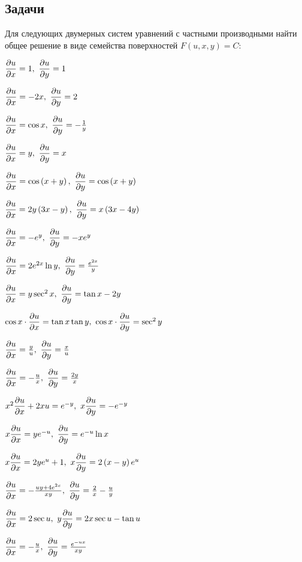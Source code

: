 \subsection{Задачи}

	Для следующих двумерных систем уравнений с частными производными найти общее решение в виде семейства поверхностей $F(u, x, y) = C$:

	\begin{multicols}{2}
		\begin{enumtasks}

			\label{nonlinsys_partialsyst:systems2}
			\item \( \dfrac{\partial u}{\partial x} = 1, ~ \dfrac{\partial u}{\partial y} = 1 \) %
			\item \( \dfrac{\partial u}{\partial x} = -2x, ~ \dfrac{\partial u}{\partial y} = 2 \) %
			\item \( \dfrac{\partial u}{\partial x} = \cos{x}, ~ \dfrac{\partial u}{\partial y} = -\frac{1}{y} \) %
			\item \( \dfrac{\partial u}{\partial x} = y, ~ \dfrac{\partial u}{\partial y} = x \) %
			\item \( \dfrac{\partial u}{\partial x} = \cos\left( x + y \right), ~ \dfrac{\partial u}{\partial y} = \cos\left( x + y \right) \) %
			\item \( \dfrac{\partial u}{\partial x} = 2y \left( 3x - y \right), ~ \dfrac{\partial u}{\partial y} = x \left( 3x - 4y \right) \) %
			\item \( \dfrac{\partial u}{\partial x} = - e^{y}, ~ \dfrac{\partial u}{\partial y} = - x e^{y} \) %
			\item \( \dfrac{\partial u}{\partial x} = 2 e^{2 x} \ln{y}, ~ \dfrac{\partial u}{\partial y} = \frac{e^{2x}}{y} \) %
			\item \( \dfrac{\partial u}{\partial x} = y \sec^2{x}, ~ \dfrac{\partial u}{\partial y} = \tan{x} - 2y \) %
			\item \( \cos{x} \cdot \dfrac{\partial u}{\partial x} = \tan{x} \tan{y}, ~ \cos{x} \cdot \dfrac{\partial u}{\partial y} = \sec^2{y} \) %
			\item \( \dfrac{\partial u}{\partial x} = \frac{y}{u}, ~ \dfrac{\partial u}{\partial y} = \frac{x}{u} \) %
			\item \( \dfrac{\partial u}{\partial x} = - \frac{u}{x}, ~ \dfrac{\partial u}{\partial y} = \frac{2 y}{x} \) %
			\item \( x^2 \dfrac{\partial u}{\partial x} + 2xu = e^{-y}, ~ x\dfrac{\partial u}{\partial y} = -e^{-y} \) %
			\item \( x\dfrac{\partial u}{\partial x} = y e^{-u}, ~ \dfrac{\partial u}{\partial y} = e^{-u} \ln{x} \) %
			\item \( x\dfrac{\partial u}{\partial x} = 2 y e^{u} + 1, ~ x\dfrac{\partial u}{\partial y} = 2 \left(x - y\right) e^{u} \) %
			\item \( \dfrac{\partial u}{\partial x} = -\frac{u y + 4 e^{2 x}}{x y}, ~ \dfrac{\partial u}{\partial y} = \frac{2}{x} - \frac{u}{y} \) %
			\item \( \dfrac{\partial u}{\partial x} = 2 \sec{u}, ~ y \dfrac{\partial u}{\partial y} = 2x \sec{u} - \tan{u} \) %
			\item \( \dfrac{\partial u}{\partial x} = - \frac{u}{x}, ~ \dfrac{\partial u}{\partial y} = \frac{e^{-ux}}{xy} \) %
			
		\end{enumtasks}
	\end{multicols}
		
